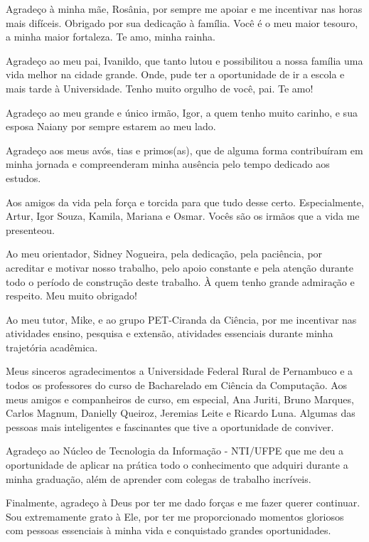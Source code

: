 \begin{agradecimentos}
Agradeço à minha mãe, Rosânia, por sempre me apoiar e me incentivar nas horas mais difíceis. Obrigado por sua dedicação à família. Você é o meu maior tesouro, a minha maior fortaleza. Te amo, minha rainha.

Agradeço ao meu pai, Ivanildo, que tanto lutou e possibilitou a nossa família uma vida melhor na cidade grande. Onde, pude ter a oportunidade de ir a escola e mais tarde à Universidade. Tenho muito orgulho de você, pai. Te amo!

Agradeço ao meu grande e único irmão, Igor, a quem tenho muito carinho, e sua esposa Naiany por sempre estarem ao meu lado.

Agradeço aos meus avós, tias e primos(as), que de alguma forma contribuíram em minha jornada e compreenderam minha ausência pelo tempo dedicado aos estudos.

Aos amigos da vida pela força e torcida para que tudo desse certo. Especialmente, Artur, Igor Souza, Kamila, Mariana e Osmar. Vocês são os irmãos que a vida me presenteou.

Ao meu orientador, Sidney Nogueira, pela dedicação, pela paciência, por acreditar e motivar nosso trabalho, pelo apoio constante e pela atenção durante todo o período de construção deste trabalho. À quem tenho grande admiração e respeito. Meu muito obrigado!

Ao meu tutor, Mike, e ao grupo PET-Ciranda da Ciência, por me incentivar nas atividades ensino, pesquisa e extensão, atividades essenciais durante minha trajetória acadêmica.

Meus sinceros agradecimentos a Universidade Federal Rural de Pernambuco e a todos os professores do curso de Bacharelado em Ciência da Computação. Aos meus amigos e companheiros de curso, em especial, Ana Juriti, Bruno Marques, Carlos Magnum, Danielly Queiroz, Jeremias Leite e Ricardo Luna. Algumas das pessoas mais inteligentes e fascinantes que tive a oportunidade de conviver.

Agradeço ao Núcleo de Tecnologia da Informação - NTI/UFPE que me deu a oportunidade de aplicar na prática todo o conhecimento que adquiri durante a minha graduação, além de aprender com colegas de trabalho incríveis.

Finalmente, agradeço à Deus por ter me dado forças e me fazer querer continuar. Sou extremamente grato à Ele, por ter me proporcionado momentos gloriosos com pessoas essenciais à minha vida e conquistado grandes oportunidades.


\end{agradecimentos}

